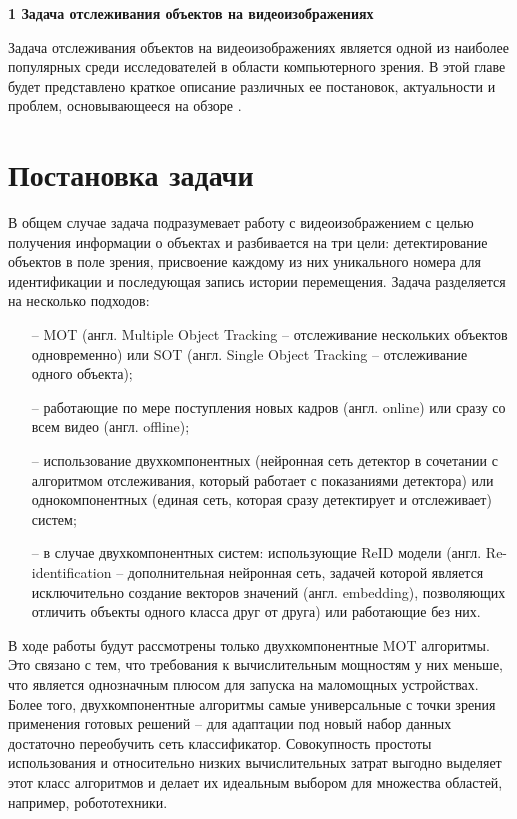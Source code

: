 \newpage
\begin{flushleft}
  \textbf{\large 1 Задача отслеживания объектов на видеоизображениях}
\end{flushleft}

Задача отслеживания объектов на видеоизображениях является одной из наиболее популярных среди исследователей в области компьютерного зрения. 
В этой главе будет представлено краткое описание различных ее постановок, актуальности и проблем, основывающееся на обзоре \cite{du2024exploring}. 


\section{Постановка задачи}
В общем случае задача подразумевает работу с видеоизображением с целью получения информации о объектах и разбивается на три цели:
детектирование объектов в поле зрения, присвоение каждому из них уникального номера для идентификации и последующая запись истории перемещения. Задача разделяется на несколько подходов:
\begin{itemize}
    \item[--] MOT (англ. Multiple Object Tracking -- отслеживание нескольких объектов одновременно) или SOT (англ. Single Object Tracking -- отслеживание одного объекта);
    \item[--] работающие по мере поступления новых кадров (англ. online) или сразу со всем видео (англ. offline);
    \item[--] использование двухкомпонентных (нейронная сеть детектор в сочетании с алгоритмом отслеживания, который работает с показаниями детектора) или однокомпонентных (единая сеть, которая сразу детектирует и отслеживает) систем;
    \item[--] в случае двухкомпонентных систем: использующие ReID модели (англ. Re-identification -- дополнительная нейронная сеть, задачей которой является исключительно создание векторов значений (англ. embedding), позволяющих отличить объекты одного класса друг от друга) или работающие без них.
\end{itemize}

В ходе работы будут рассмотрены только двухкомпонентные MOT алгоритмы. Это связано с тем, что требования к вычислительным мощностям у них меньше, что является однозначным плюсом для запуска на маломощных устройствах.
Более того, двухкомпонентные алгоритмы самые универсальные с точки зрения применения готовых решений -- для адаптации под новый набор данных достаточно переобучить сеть классификатор.
Совокупность простоты использования и относительно низких вычислительных затрат выгодно выделяет этот класс алгоритмов и делает их идеальным выбором для множества областей, например, робототехники.


